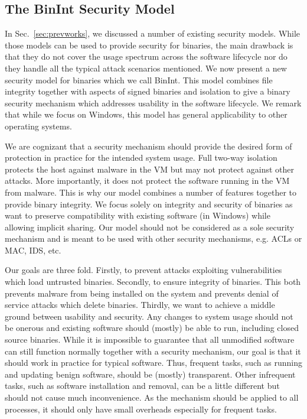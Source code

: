 \subsection{The BinInt Security Model}
\label{sec:binint-model}

In Sec.~\ref{sec:prevworks}, we discussed a number of existing
security models. While those models can be used to provide security
for binaries, the main drawback is that they do not cover the usage spectrum
across the software lifecycle nor do they handle all the
typical attack scenarios mentioned.
We now present a new security model for binaries
which we call BinInt.
This model combines file integrity together with
aspects of signed binaries and isolation to give a binary
security mechanism which 
addresses usability in the software lifecycle. We remark
that while we focus on Windows, this model has general applicability
to other operating systems.

We are cognizant that a security mechanism
should provide the desired form of protection in practice for
the intended system usage.
Full two-way isolation protects the host
against malware in the VM but may not
protect against other attacks.
More importantly, it does not protect the software running 
in the VM from malware.
This is why our model combines a number of features together to provide
binary integrity. 
We focus solely on integrity and security of binaries
as want to preserve compatibility with existing
software (in Windows) while allowing implicit sharing.
Our model should not be considered as a sole security mechanism and
is meant to be used with other security mechanisms, 
e.g. ACLs or MAC, IDS, etc.

Our goals are three fold.
Firstly, to prevent attacks exploiting vulnerabilities which load 
untrusted binaries.
Secondly, to ensure integrity of binaries.
This both prevents malware from being installed on the system and 
prevents denial of service attacks which delete binaries.
Thirdly, we want to achieve a middle ground
between usability and security.
Any changes to system usage should not be onerous and existing software 
should (mostly) be able to run, including closed source binaries.
While it is impossible to guarantee that all unmodified software can still
function normally together with a security mechanism, our goal is that
it should work in practice for typical software.
Thus, frequent tasks, such as running and updating benign software, 
should be (mostly) transparent.
Other infrequent tasks, such as software installation and removal, 
can be a little different but should not cause much inconvenience.
As the mechanism should be applied to all processes, 
it should only have small overheads especially for frequent tasks.


